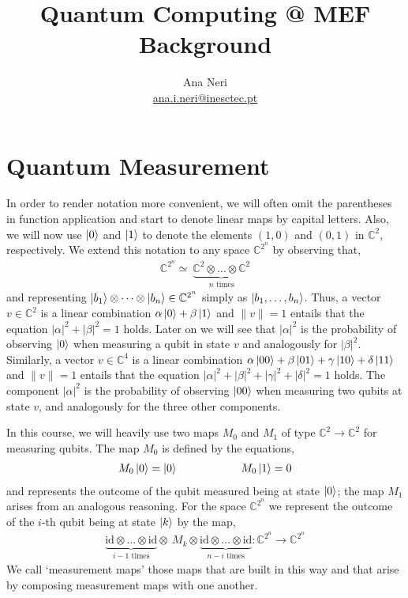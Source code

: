 \documentclass[a4paper, 11pt]{article}
\date{}
\newcommand{\complex}{\mathbb{C}}
\newcommand{\id}{\mathrm{id}}
\theoremstyle{definition}
\begin{document}
\title{Quantum Computing @ MEF \\ \large Background}
\author{Ana Neri \\ \scriptsize
\href{mailto:ana.i.neri@inesctec.pt}{ana.i.neri@inesctec.pt}}
\maketitle

\section{Quantum Measurement}

In order to render notation more convenient, we will often omit the
parentheses in function application and start to denote linear maps by
capital letters. Also, we will now use $\ket{0}$ and $\ket{1}$ to
denote the elements $(1,0)$ and $(0,1)$ in $\complex^2$,
respectively. We extend this notation to any space $\complex^{2^n}$ by
observing that,
\begin{align*}
  \complex^{2^n} \simeq\ \underbrace{\complex^2 \otimes \dots \otimes \complex^2}_
  {n \text{ times} }
\end{align*}
and representing
$\ket{b_1} \otimes \dots \otimes \ket{b_n} \in \complex^{2^n}$ simply
as $\ket{b_1, \dots, b_n}$. Thus, a vector $v \in \complex^2$ is a
linear combination $\alpha \ket{0} + \beta \ket{1}$ and $\| v \| = 1$
entails that the equation $| \alpha |^2 + | \beta |^2 = 1$
holds. Later on we will see that $| \alpha |^2$ is the probability of
observing $\ket{0}$ when measuring a qubit in state $v$ and
analogously for $| \beta |^2$. Similarly, a vector $v \in \complex^4$
is a linear combination
$\alpha \ket{00} + \beta \ket{01} + \gamma \ket{10} + \delta \ket{11}$
and $\| v \| = 1$ entails that the equation
$| \alpha |^2 + | \beta |^2 + | \gamma |^2 + | \delta |^2 = 1$ holds. The
component $| \alpha |^2$ is the probability of observing $\ket{00}$
when measuring two qubits at state $v$, and analogously for the three
other components.

In this course, we will heavily use two maps $M_0$ and $M_1$ of type
$\complex^2 \to \complex^2$ for measuring qubits. The map $M_0$ is
defined by the equations,
\begin{align*}
  M_0 \ket{0} = \ket{0} \hspace{2cm} M_0 \ket{1} = 0
\end{align*}
and represents the outcome of the qubit measured being at state
$\ket{0}$; the map $M_1$ arises from an analogous reasoning. For the
space $\complex^{2^n}$ we represent the outcome of the $i$-th
qubit being at state $\ket{k}$ by the map,
\begin{align*}
  \underbrace{\id \otimes \dots \otimes \id}_{i-1 \text{ times}} \otimes\ M_k \otimes
  \underbrace{\id \otimes \dots \otimes \id}_{n - i  \text{ times}}
  : \complex^{2^n} \to \complex^{2^n}
\end{align*}
We call `measurement maps' those maps that are built in this way and
that arise by composing measurement maps with one another.
\end{document}
